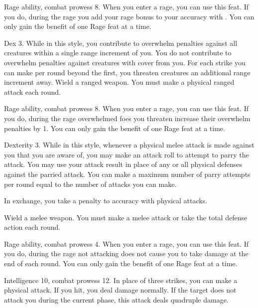\featpres Rage ability, combat prowess 8.
\featben When you enter a rage, you can use this feat. If you do, during the rage you add your rage bonus to your accuracy with .
 You can only gain the benefit of one Rage feat at a time.

\featpre Dex 3.
\featben While in this style, you contribute to overwhelm penalties against all creatures within a single range increment of you.
You do not contribute to overwhelm penalties against creatures with cover from you.
For each strike you can make per round beyond the first, you threaten creatures an additional range increment away.
\stylereq Wield a ranged weapon.
You must make a physical ranged attack each round.

\featpres Rage ability, combat prowess 8.
\featben When you enter a rage, you can use this feat. If you do, during the rage overwhelmed foes you threaten increase their overwhelm penalties by 1.
 You can only gain the benefit of one Rage feat at a time.

\featpre Dexterity 3.
\featben While in this style, whenever a physical melee attack is made against you that you are aware of, you may make an attack roll to attempt to parry the attack.
You may use your attack result in place of any or all physical defenses against the parried attack.
You can make a maximum number of parry attempts per round equal to the number of attacks you can make.

In exchange, you take a  penalty to accuracy with physical attacks.

\stylereq Wield a melee weapon.
You must make a melee attack or take the total defense action each round.

\featpres Rage ability, combat prowess 4.
\featben When you enter a rage, you can use this feat. If you do, during the rage not attacking does not cause you to take damage at the end of each round.
 You can only gain the benefit of one Rage feat at a time.

\featpres Intelligence 10, combat prowess 12.
\featben In place of three strikes, you can make a physical attack.
If you hit, you deal damage normally.
If the target does not attack you during the current phase, this attack deals quadruple damage.

